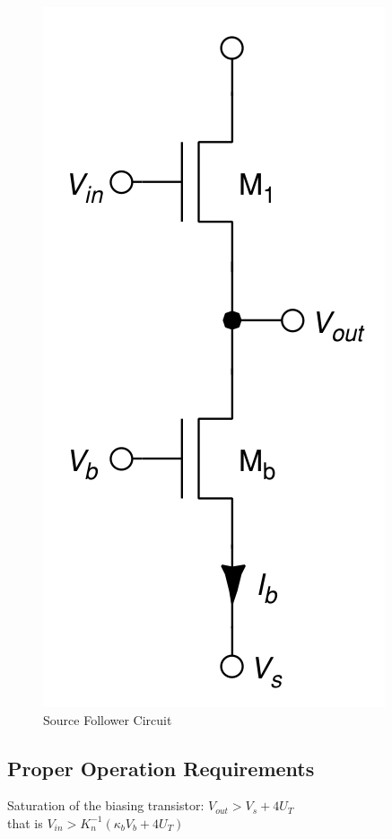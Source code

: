 \begin{figure}[htbp]
  \centering
  \includegraphics[scale=1]{pics/source-follower.png}
  \caption{Source Follower Circuit \cite{book:VLSI}}
  \label{fig:Source_Follower_Structure}
\end{figure}

\subsection{Proper Operation Requirements}
Saturation of the biasing transistor: $V_{out} > V_s + 4U_T$\\
that is $V_{in} > K_{n}^{-1}(\kappa_b V_b + 4U_T)$


